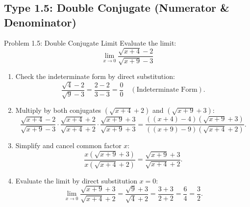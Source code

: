 \documentclass[11pt,a4paper]{article}
\begin{document}
\subsection{Type 1.5: Double Conjugate (Numerator \& Denominator)}
\begin{problembox}{Problem 1.5: Double Conjugate Limit}
Evaluate the limit:
\[
\lim_{x \to 0} \frac{\sqrt{x + 4} - 2}{\sqrt{x + 9} - 3}
\]
\end{problembox}
\begin{solutionbox}
\begin{enumerate}
	\item [Step 1.] Check the indeterminate form by direct substitution:
	\begin{equation*}
		\frac{\sqrt{4} - 2}{\sqrt{9} - 3} = \frac{2 - 2}{3 - 3} = \frac{0}{0} \quad (\text{Indeterminate Form}).
	\end{equation*}
	
	\item [Step 2.] Multiply by both conjugates $(\sqrt{x + 4} + 2)$ and $(\sqrt{x + 9} + 3)$:
	\begin{equation*}
		\frac{\sqrt{x + 4} - 2}{\sqrt{x + 9} - 3} \cdot \frac{\sqrt{x + 4} + 2}{\sqrt{x + 4} + 2} \cdot \frac{\sqrt{x + 9} + 3}{\sqrt{x + 9} + 3}
		= \frac{((x + 4) - 4)(\sqrt{x + 9} + 3)}{((x + 9) - 9)(\sqrt{x + 4} + 2)}.
	\end{equation*}

	\item [Step 3.] Simplify and cancel common factor $x$:
	\begin{equation*}
		\frac{x(\sqrt{x + 9} + 3)}{x(\sqrt{x + 4} + 2)} = \frac{\sqrt{x + 9} + 3}{\sqrt{x + 4} + 2}.
	\end{equation*}

	\item [Step 4.] Evaluate the limit by direct substitution $x = 0$:
	\begin{equation*}
		\lim_{x \to 0} \frac{\sqrt{x + 9} + 3}{\sqrt{x + 4} + 2} = \frac{\sqrt{9} + 3}{\sqrt{4} + 2} = \frac{3 + 3}{2 + 2} = \frac{6}{4} = \frac{3}{2}.
	\end{equation*}
\end{enumerate}
\end{solutionbox}
\end{document}
